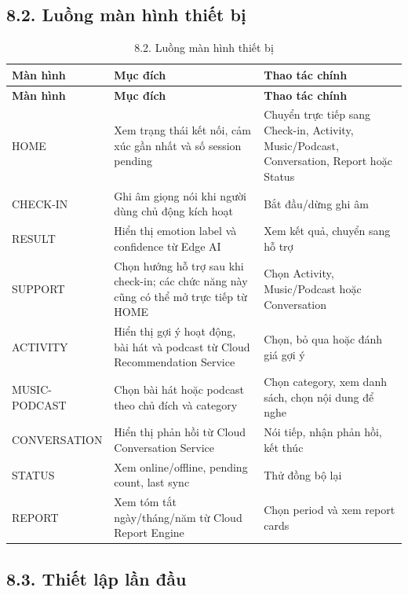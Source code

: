 \documentclass[12pt,a4paper]{article}
\begin{document}
\subsection*{8.2. Luồng màn hình thiết bị}

\begin{center}
\begin{longtable}{|P{0.25\textwidth}|P{0.32\textwidth}|P{0.33\textwidth}|}
\caption{8.2. Luồng màn hình thiết bị}\\
\hline
\textbf{Màn hình} & \textbf{Mục đích} & \textbf{Thao tác chính} \\
\hline
\endfirsthead
\hline
\textbf{Màn hình} & \textbf{Mục đích} & \textbf{Thao tác chính} \\
\hline
\endhead
HOME & Xem trạng thái kết nối, cảm xúc gần nhất và số session pending & Chuyển trực tiếp sang Check-in, Activity, Music/Podcast, Conversation, Report hoặc Status \\
\hline
CHECK-IN & Ghi âm giọng nói khi người dùng chủ động kích hoạt & Bắt đầu/dừng ghi âm \\
\hline
RESULT & Hiển thị emotion label và confidence từ Edge AI & Xem kết quả, chuyển sang hỗ trợ \\
\hline
SUPPORT & Chọn hướng hỗ trợ sau khi check-in; các chức năng này cũng có thể mở trực tiếp từ HOME & Chọn Activity, Music/Podcast hoặc Conversation \\
\hline
ACTIVITY & Hiển thị gợi ý hoạt động, bài hát và podcast từ Cloud Recommendation Service & Chọn, bỏ qua hoặc đánh giá gợi ý \\
\hline
MUSIC-PODCAST & Chọn bài hát hoặc podcast theo chủ đích và category & Chọn category, xem danh sách, chọn nội dung để nghe \\
\hline
CONVERSATION & Hiển thị phản hồi từ Cloud Conversation Service & Nói tiếp, nhận phản hồi, kết thúc \\
\hline
STATUS & Xem online/offline, pending count, last sync & Thử đồng bộ lại \\
\hline
REPORT & Xem tóm tắt ngày/tháng/năm từ Cloud Report Engine & Chọn period và xem report cards \\
\hline
\end{longtable}
\end{center}

\subsection*{8.3. Thiết lập lần đầu}
\end{document}

